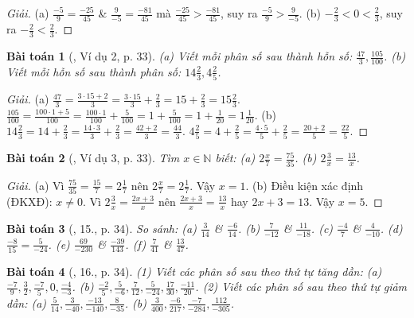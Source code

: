 \documentclass{article}
\newtheorem{baitoan}{Bài toán}
\begin{document}
\begin{proof}[Giải]
	(a) $\frac{-5}{9} = \frac{-25}{45}$ \& $\frac{9}{-5} = \frac{-81}{45}$ mà $\frac{-25}{45} > \frac{-81}{45}$, suy ra $\frac{-5}{9} > \frac{9}{-5}$. (b) $-\frac{2}{3} < 0 < \frac{2}{3}$, suy ra $-\frac{2}{3} < \frac{2}{3}$.
\end{proof}

\begin{baitoan}[\cite{SBT_Toan_6_Canh_Dieu_tap_2}, Ví dụ 2, p. 33]
	(a) Viết mỗi phân số sau thành hỗn số: $\frac{47}{3},\frac{105}{100}$. (b) Viết mỗi hỗn số sau thành phân số: $14\frac{2}{3},4\frac{2}{5}$.
\end{baitoan}

\begin{proof}[Giải]
	(a) $\frac{47}{3} = \frac{3\cdot15 + 2}{3} = \frac{3\cdot15}{3} + \frac{2}{3} = 15 + \frac{2}{3} = 15\frac{2}{3}$. $\frac{105}{100} = \frac{100\cdot1  + 5}{100} = \frac{100\cdot1}{100} + \frac{5}{100} = 1 + \frac{5}{100} = 1 + \frac{1}{20} = 1\frac{1}{20}$. (b)  $14\frac{2}{3} = 14 + \frac{2}{3} = \frac{14\cdot3}{3} + \frac{2}{3} = \frac{42 + 2}{3} = \frac{44}{3}$. $4\frac{2}{5} = 4 + \frac{2}{5} = \frac{4\cdot5}{5} + \frac{2}{5} = \frac{20 + 2}{5} = \frac{22}{5}$.
\end{proof}

\begin{baitoan}[\cite{SBT_Toan_6_Canh_Dieu_tap_2}, Ví dụ 3, p. 33]
	Tìm $x\in\mathbb{N}$ biết: (a) $2\frac{x}{7} = \frac{75}{35}$. (b) $2\frac{3}{x} = \frac{13}{x}$.
\end{baitoan}

\begin{proof}[Giải]
	(a) Vì $\frac{75}{35} = \frac{15}{7} = 2\frac{1}{7}$ nên $2\frac{x}{7} = 2\frac{1}{7}$. Vậy $x = 1$. (b) Điều kiện xác định (ĐKXĐ): $x\ne0$. Vì $2\frac{3}{x} = \frac{2x + 3}{x}$ nên $\frac{2x + 3}{x} = \frac{13}{x}$ hay $2x + 3 = 13$. Vậy $x = 5$.
\end{proof}

\begin{baitoan}[\cite{SBT_Toan_6_Canh_Dieu_tap_2}, 15., p. 34]
	So sánh: (a) $\frac{3}{14}$ \& $\frac{-6}{14}$. (b) $\frac{7}{-12}$ \& $\frac{11}{-18}$. (c) $\frac{-4}{7}$ \& $\frac{4}{-10}$. (d) $\frac{-8}{15} = \frac{5}{-24}$. (e) $\frac{69}{-230}$ \& $\frac{-39}{143}$. (f) $\frac{7}{41}$ \& $\frac{13}{47}$.
\end{baitoan}

\begin{baitoan}[\cite{SBT_Toan_6_Canh_Dieu_tap_2}, 16., p. 34]
	 (1) Viết các phân số sau theo thứ tự tăng dần: (a) $\frac{-7}{9},\frac{3}{2},\frac{-7}{5},0,\frac{-4}{-3}$. (b) $\frac{-2}{5},\frac{5}{-6},\frac{7}{12},\frac{5}{-24},\frac{17}{30},\frac{-11}{20}$. (2) Viết các phân số sau theo thứ tự giảm dần: (a) $\frac{5}{14},\frac{3}{-40},\frac{-13}{-140},\frac{8}{-35}$. (b) $\frac{3}{400},\frac{-6}{217},\frac{-7}{-284},\frac{112}{-305}$.
\end{baitoan}
\end{document}
